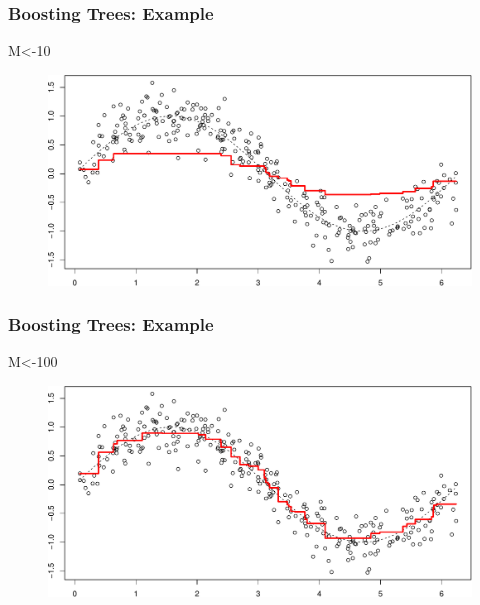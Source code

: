 \documentclass[
  shownotes,
  xcolor={svgnames},
  hyperref={colorlinks,citecolor=DarkBlue,linkcolor=DarkRed,urlcolor=DarkBlue}
  , aspectratio=169]{beamer}
\newenvironment{Shaded}{\begin{snugshade}}{\end{snugshade}}
\newcommand{\DecValTok}[1]{\textcolor[rgb]{0.00,0.00,0.81}{#1}}
\newcommand{\NormalTok}[1]{#1}
\begin{document}
\begin{frame}
\frametitle{Boosting Trees: Example}

\begin{Shaded}
\begin{Highlighting}[]
\NormalTok{M\textless{}{-}}\DecValTok{10}
\end{Highlighting}
\end{Shaded}

\begin{figure}[H] \centering
            \captionsetup{justification=centering}
              \includegraphics[scale=0.5]{figures/unnamed-chunk-6-1.pdf}
 \end{figure}
 \end{frame}
\begin{frame}
\frametitle{Boosting Trees: Example}

\begin{Shaded}
\begin{Highlighting}[]
\NormalTok{M\textless{}{-}}\DecValTok{100}
\end{Highlighting}
\end{Shaded}

\begin{figure}[H] \centering
            \captionsetup{justification=centering}
              \includegraphics[scale=0.5]{figures/unnamed-chunk-7-1.pdf}
 \end{figure}

 \end{frame}
\end{document}
